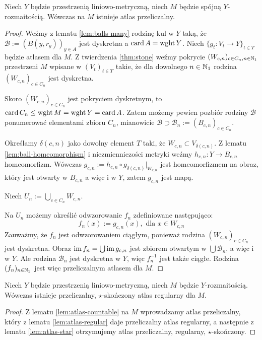 \begin{lem} \label{lem:atlas-countable}
  Niech $Y$ będzie przestrzenią liniowo-metryczną, niech $M$ będzie spójną $Y$-rozmaitością. Wówczas na $M$ istnieje atlas przeliczalny.
  \begin{proof}
    Weźmy z lematu \ref{lem:balls-many} rodzinę kul w $Y$ taką, że $\mathcal B := (B(y,r_y))_{y\in A}$ jest dyskretna a $\operatorname{card} A = \operatorname{wght} Y$.
    Niech $\{g_t: V_t \to Y\}_{t \in T}$ będzie atlasem dla $M$.
    Z twierdzenia \ref{thm:stone} weźmy pokrycie $(W_{c,n})_{c \in C_n, n \in {\mathbb{N}_1}}$ przestrzeni $M$ wpisane w $(V_t)_{t \in T}$ takie, że dla dowolnego $n \in {\mathbb{N}_1}$ rodzina $(W_{c,n})_{c \in C_n}$ jest dyskretna.
    
    Skoro $(W_{c,n})_{c \in C_n}$ jest pokryciem dyskretnym, to $\operatorname{card} C_n \leq \operatorname{wght} M = \operatorname{wght} Y = \operatorname{card} A$.
    Zatem możemy pewien pozbiór rodziny $\mathcal B$ ponumerować elementami zbioru $C_n$, mianowicie $\mathcal B \supset \mathcal B_n := (B_{c,n})_{c \in C_n}$.
    
    Określamy $\delta(c,n)$ jako dowolny element $T$ taki, że $W_{c,n} \subset V_{\delta(c,n)}$. Z lematu \ref{lem:ball-homeomorphism} i niezmienniczości metryki weźmy $h_{c,n}: Y \to B_{c,n}$ homeomorfizm. Wówczas $g_{c,n} := h_{c,n} \circ g_{\delta(c,n)}|_{W_{c,n}}$ jest homeomorfizmem na obraz, który jest otwarty w $B_{c,n}$ a więc i w $Y$, zatem $g_{c,n}$ jest mapą.
    
    Niech $U_n := \bigcup_{c \in C_n} W_{c,n}$.
    
    Na $U_n$ możemy określić odwzorowanie $f_n$ zdefiniowane następująco:
    \[
      f_n(x) := g_{c,n}(x),\mbox{ dla }x\in W_{c,n}
    \]
    Zauważmy, że $f_n$ jest odwzorowaniem ciągłym, ponieważ rodzina $(W_{c,n})_{c \in C_n}$ jest dyskretna. Obraz $\operatorname{im} f_n = \bigcup \operatorname{im} g_{c,n}$ jest zbiorem otwartym w $\bigcup \mathcal B_n$, a więc i w $Y$. Ale rodzina $\mathcal B_n$ jest dyskretna w $Y$, więc $f_n^{-1}$ jest także ciągłe.
    Rodzina $(f_n)_{n \in {\mathbb{N}_1}}$ jest więc przeliczalnym atlasem dla $M$.
  \end{proof}
\end{lem}

\begin{thm} \label{thm:super-atlas}
  Niech $Y$ będzie przestrzenią liniowo-metryczną, niech $M$ będzie $Y$-rozmaitością. Wówczas istnieje przeliczalny, $\star$-skończony atlas regularny dla $M$.
  \begin{proof}
    Z lematu \ref{lem:atlas-countable} na $M$ wprowadzamy atlas przeliczalny, który z lematu \ref{lem:atlas-regular} daje przeliczalny atlas regularny, a następnie z lematu \ref{lem:atlas-star} otrzymujemy atlas przeliczalny, regularny, $\star$-skończony.
  \end{proof}
\end{thm}